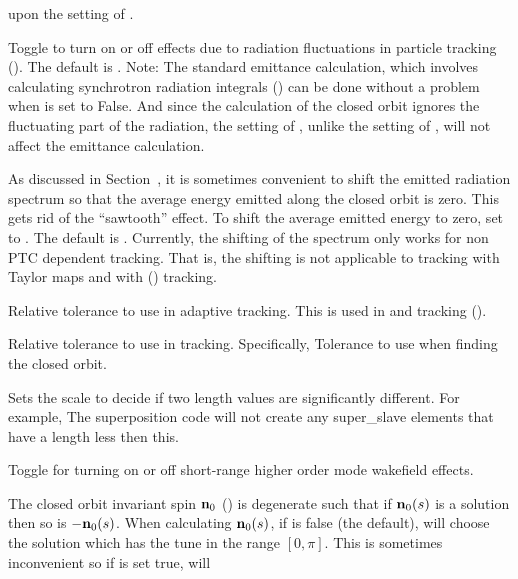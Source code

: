 {\begin{description}
upon the setting of .
%
\item[\vn{radiation_fluctuations_on}] \Newline
Toggle to turn on or off effects due to radiation fluctuations in particle tracking
().  The default is . Note: The standard \bmad emittance calculation,
which involves calculating synchrotron radiation integrals () can be done without
a problem when  is set to False. And since the calculation of the closed orbit
ignores the fluctuating part of the radiation, the setting of , unlike the
setting of , will not affect the emittance calculation.
%
\item[\vn{radiation_zero_average}] \Newline
As discussed in Section~, it is sometimes convenient to shift the emitted radiation
spectrum so that the average energy emitted along the closed orbit is zero. This gets rid of the ``sawtooth''
effect. To shift the average emitted energy to zero, set  to . The
default is . Currently, the shifting of the spectrum only works for non PTC
dependent tracking. That is, the shifting is not applicable to tracking with Taylor maps and with
 () tracking.
%
\item[\vn{rel_tol_adaptive_tracking}] \Newline
Relative tolerance to use in adaptive tracking. This is used in  and
 tracking ().
%
\item[\vn{rel_tol_tracking}] \Newline
Relative tolerance to use in tracking. Specifically, Tolerance to use when finding the closed orbit.
%
\item[\vn{significant_length}] \Newline
Sets the scale to decide if two length values are significantly different. For example, The
superposition code will not create any super_slave elements that have a length less then this.
%
\item[\vn{sr_wakes_on}] \Newline
Toggle for turning on or off short-range higher order mode wakefield effects.
%
\item[\vn{spin_n0_direction_user_set}] \Newline
The closed orbit invariant spin ${\bf n}_0$ () is degenerate such that if ${\bf n}_0(s)$ is a
solution then so is $-{\bf n}_0(s)$. When calculating ${\bf n}_0(s)$, if 
is false (the default), \bmad will choose the solution which has the tune in the range $[0,
\pi]$. This is sometimes inconvenient so if  is set true, \bmad will

\end{description}}
